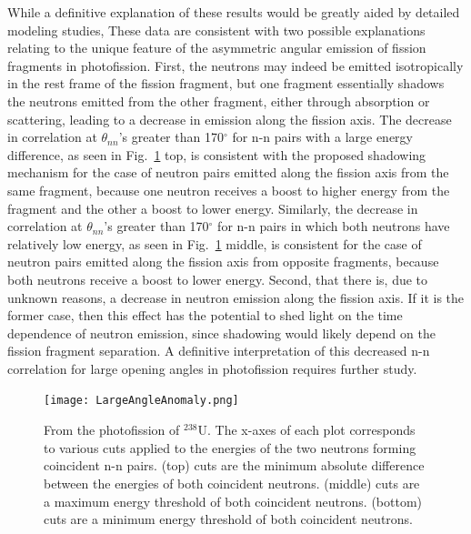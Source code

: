 While a definitive explanation of these results would be greatly aided by detailed modeling studies,
These data are consistent with two possible explanations relating to the unique feature of the asymmetric angular emission of fission fragments in photofission.
First, the neutrons may indeed be emitted isotropically in the rest frame of the fission fragment, but one fragment essentially shadows the neutrons emitted from the other fragment, either through absorption or scattering, leading to a decrease in emission along the fission axis.
The decrease in correlation at $\theta_{nn}$'s greater than 170$^{\circ}$ for n-n pairs with a large energy difference, as seen in Fig.~\ref{fig:LargeAngleAnomaly} top, is consistent with the proposed shadowing mechanism for the case of neutron pairs emitted along the fission axis from the same fragment, because one neutron receives a boost to higher energy from the fragment and the other a boost to lower energy.
Similarly, the decrease in correlation at $\theta_{nn}$'s greater than 170$^{\circ}$ for n-n pairs in which both neutrons have relatively low energy, as seen in Fig.~\ref{fig:LargeAngleAnomaly} middle, is consistent for the case of neutron pairs emitted along the fission axis from opposite fragments, because both neutrons receive a boost to lower energy.
Second, that there is, due to unknown reasons, a decrease in neutron emission along the fission axis.
If it is the former case, then this effect has the potential to shed light on the time dependence of neutron emission, since shadowing would likely depend on the fission fragment separation.
A definitive interpretation of this decreased n-n correlation for large opening angles in photofission requires further study.

\begin{figure}
\centering
    \texttt{[image: LargeAngleAnomaly.png]}
    \caption{From the photofission of $^{238}$U. The x-axes of each plot corresponds to various cuts applied to the energies of the two neutrons forming coincident n-n pairs.
     (top) cuts are the minimum absolute difference between the energies of both coincident neutrons. (middle) cuts are a maximum energy threshold of both coincident neutrons. (bottom) cuts are a minimum energy threshold of both coincident neutrons.}
    \label{fig:LargeAngleAnomaly}
\end{figure}


